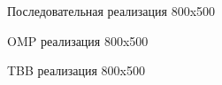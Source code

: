 \documentclass{report}
\begin{document}
\begin{figure}[H]
\caption{Последовательная реализация 800x500}
\end{figure}

\begin{figure}[H]
\caption{OMP реализация 800x500}
\end{figure}

\begin{figure}[H]
\caption{TBB реализация 800x500}
\end{figure}
\end{document}
